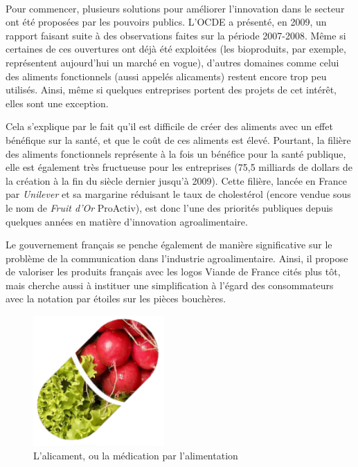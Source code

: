\documentclass[a4paper,12pt]{report}
\begin{document}
		\paragraph{}Pour commencer, plusieurs solutions pour améliorer l’innovation dans le secteur ont été proposées par les pouvoirs publics. L’OCDE a présenté, en 2009, un rapport \cite{OECD} faisant suite à des observations faites sur la période 2007-2008. Même si certaines de ces ouvertures ont déjà été exploitées (les bioproduits, par exemple, représentent aujourd’hui un marché en vogue), d'autres domaines comme celui des aliments fonctionnels (aussi appelés alicaments) restent encore trop peu utilisés. Ainsi, même si quelques entreprises portent des projets de cet intérêt, elles sont une exception.
		
		Cela s’explique par le fait qu’il est difficile de créer des aliments avec un effet bénéfique sur la santé, et que le coût de ces aliments est élevé. Pourtant, la filière des aliments fonctionnels représente à la fois un bénéfice pour la santé publique, elle est également très fructueuse pour les entreprises (75,5 milliards de dollars de la création à la fin du siècle dernier jusqu’à 2009). Cette filière, lancée en France par \textit{Unilever} et sa margarine réduisant le taux de cholestérol (encore vendue sous le nom de \textit{Fruit d’Or} ProActiv)\cite{FruitDOr}, est donc l’une des priorités publiques depuis quelques années en matière d’innovation agroalimentaire.
		
		Le gouvernement français se penche également de manière significative sur le problème de la communication dans l’industrie agroalimentaire. Ainsi, il propose de valoriser les produits français avec les logos Viande de France cités plus tôt, mais cherche aussi à instituer une simplification à l’égard des consommateurs avec la notation par étoiles sur les pièces bouchères\cite{EtoilesViande}. 

			\begin{figure}[!h]
\centering
			\includegraphics[width=5cm]{Illustrations/Alicament.png}
			\caption{L'alicament, ou la médication par l'alimentation}
			\label{alicament}
			\end{figure}
			
\end{document}
